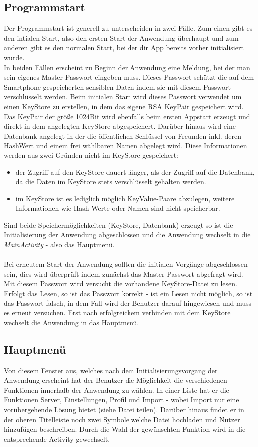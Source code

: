 \documentclass[10pt, a4paper,headsepline]{scrreprt}
\begin{document}
\subsection{Programmstart}
Der Programmstart ist generell zu unterscheiden in zwei Fälle. Zum einen gibt es den intialen Start, also den ersten Start der Anwendung überhaupt und  zum anderen gibt es den normalen Start, bei der dir App bereits vorher initialisiert wurde. \\
In beiden Fällen erscheint zu Beginn der Anwendung eine Meldung, bei der man sein eigenes Master-Passwort eingeben muss. Dieses Passwort schützt die auf dem Smartphone gespeicherten sensiblen Daten indem sie mit diesem Passwort verschlüsselt werden. Beim initialen Start wird dieses Passwort verwendet um einen KeyStore zu erstellen, in dem das eigene RSA KeyPair gespeichert wird. Das KeyPair der größe 1024Bit wird ebenfalls beim ersten Appstart erzeugt und direkt in dem angelegten KeyStore abgespeichert. Darüber hinaus wird eine Datenbank angelegt in der die öffentlichen Schlüssel von Freunden inkl. deren HashWert und einem frei wählbaren Namen abgelegt wird. Diese Informationen werden aus zwei Gründen nicht im KeyStore gespeichert:
\begin{itemize}
\item der Zugriff auf den KeyStore dauert länger, als der Zugriff auf die Datenbank, da die Daten im KeyStore stets verschlüsselt gehalten werden.
\item im KeyStore ist es lediglich möglich KeyValue-Paare abzulegen, weitere Informationen wie Hash-Werte oder Namen sind nicht speicherbar.
\end{itemize}
Sind beide Speichermöglichkeiten (KeyStore, Datenbank) erzeugt so ist die Initialisierung der Anwendung abgeschlossen und die Anwendung wechselt in die \textit{MainActivity} - also das Hauptmenü.\\ \\
Bei erneutem Start der Anwendung sollten die initialen Vorgänge abgeschlossen sein, dies wird überprüft indem zunächst das Master-Passwort abgefragt wird. Mit diesem Passwort wird versucht die vorhandene KeyStore-Datei zu lesen. Erfolgt das Lesen, so ist das Passwort korrekt - ist ein Lesen nicht möglich, so ist das Passwort falsch, in dem Fall wird der Benutzer darauf hingewiesen und muss es erneut versuchen. Erst nach erfolgreichem verbinden mit dem KeyStore wechselt die Anwendung in das Hauptmenü.


\subsection{Hauptmenü}
Von diesem Fenster aus, welches nach dem Initialisierungsvorgang der Anwendung erscheint hat der Benutzer die Möglichkeit die verschiedenen Funktionen innerhalb der Anwendung zu wählen. In einer Liste hat er die Funktionen Server, Einstellungen, Profil und Import - wobei Import nur eine vorübergehende Lösung bietet  (siehe Datei teilen). Darüber hinaus findet er in der oberen Titelleiste noch zwei Symbole welche Datei hochladen und Nutzer hinzufügen beschreiben. Durch die Wahl der gewünschten Funktion wird in die entsprechende Activity gewechselt.
\end{document}
